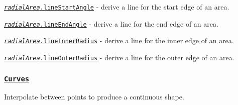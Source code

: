 \begin{DoxyItemize}
\item \href{https://github.com/d3/d3-shape/blob/master/README.md#area_lineStartAngle}{\tt {\itshape radial\+Area}.line\+Start\+Angle} -\/ derive a line for the start edge of an area.
\item \href{https://github.com/d3/d3-shape/blob/master/README.md#area_lineEndAngle}{\tt {\itshape radial\+Area}.line\+End\+Angle} -\/ derive a line for the end edge of an area.
\item \href{https://github.com/d3/d3-shape/blob/master/README.md#area_lineInnerRadius}{\tt {\itshape radial\+Area}.line\+Inner\+Radius} -\/ derive a line for the inner edge of an area.
\item \href{https://github.com/d3/d3-shape/blob/master/README.md#area_lineOuterRadius}{\tt {\itshape radial\+Area}.line\+Outer\+Radius} -\/ derive a line for the outer edge of an area.
\end{DoxyItemize}

\subsubsection*{\href{https://github.com/d3/d3-shape/blob/master/README.md#curves}{\tt Curves}}

Interpolate between points to produce a continuous shape.


